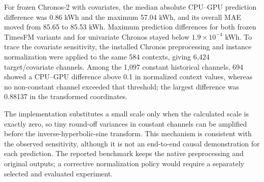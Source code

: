 For frozen Chronos-2 with covariates, the median absolute CPU--GPU prediction difference was 0.86 kWh and the maximum 57.04 kWh, and its overall MAE moved from 85.65 to 85.53 kWh. Maximum prediction differences for both frozen TimesFM variants and for univariate Chronos stayed below $1.9\times10^{-4}$ kWh. To trace the covariate sensitivity, the installed Chronos preprocessing and instance normalization were applied to the same 584 contexts, giving 6,424 target/covariate channels. Among the 1,097 constant historical channels, 694 showed a CPU--GPU difference above 0.1 in normalized context values, whereas no non-constant channel exceeded that threshold; the largest difference was 0.88137 in the transformed coordinates.

The implementation substitutes a small scale only when the calculated scale is exactly zero, so tiny round-off variances in constant channels can be amplified before the inverse-hyperbolic-sine transform. This mechanism is consistent with the observed sensitivity, although it is not an end-to-end causal demonstration for each prediction. The reported benchmark keeps the native preprocessing and original outputs; a corrective normalization policy would require a separately selected and evaluated experiment.
